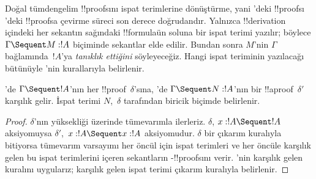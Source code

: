 



Doğal tümdengelim !!{proof}s{}ını ispat terimlerine dönüştürme, yani
'deki !!{proof}s{}ı 'deki !!{proof}s{}a çevirme süreci son
derece doğrudandır. Yalnızca !!{derivation} içindeki her sekantın sağındaki
!!{formula}{}ün soluna bir ispat terimi yazılır; böylece $\Gamma \Sequent M
: !A$ biçiminde sekantlar elde edilir. Bundan sonra $M$'nin $\Gamma$
bağlamında~$!A$'ya \emph{tanıklık ettiğini} söyleyeceğiz. Hangi ispat
teriminin yazılacağı bütünüyle 'nin kurallarıyla belirlenir.

\begin{prop}
'de $\Gamma \Sequent !A$'nın her !!{proof}~$\delta$'sına,
'de $\Gamma \Sequent N : !A$'nın bir !!a{proof}~$\delta'$ karşılık
gelir. İspat terimi $N$,~$\delta$ tarafından biricik biçimde belirlenir.
\end{prop}

\begin{proof}
$\delta$'nın yüksekliği üzerinde tümevarımla ilerleriz. $\delta$, $x:!A
\Sequent !A$ aksiyomuysa $\delta'$,~$x:!A \Sequent x:!A$ aksiyomudur.
$\delta$ bir çıkarım kuralıyla bitiyorsa tümevarım varsayımı her öncül için
ispat terimleri ve her öncüle karşılık gelen bu ispat terimlerini içeren
sekantların -!!{proof}s{}ını verir. 'nin karşılık gelen
kuralını uygularız; karşılık gelen ispat terimi  çıkarım kuralıyla
belirlenir.
\end{proof}

